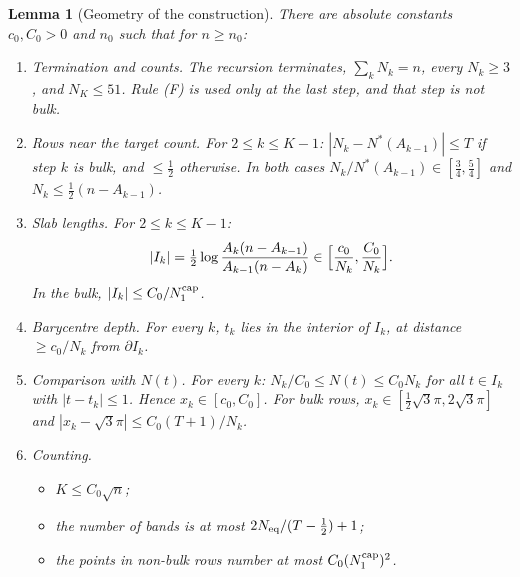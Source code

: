 \documentclass[11pt]{article}
\newtheorem{lemma}[theorem]{Lemma}
\theoremstyle{definition}
\theoremstyle{remark}
\begin{document}
\begin{lemma}[Geometry of the construction]\label{lem:geometry}
There are absolute constants $c_0,C_0>0$ and $n_0$ such that for $n\ge n_0$:
\begin{enumerate}[label=(G\arabic*)]
\item \emph{Termination and counts.} The recursion terminates, $\sum_kN_k=n$, every $N_k\ge3$,
  and $N_K\le51$. Rule (F) is used only at the last step, and that step is not bulk.
\item \emph{Rows near the target count.} For $2\le k\le K-1$: $|N_k-N^*(A_{k-1})|\le T$ if
  step $k$ is bulk, and $\le\tfrac12$ otherwise. In both cases
  $N_k/N^*(A_{k-1})\in[\tfrac34,\tfrac54]$ and $N_k\le\tfrac12(n-A_{k-1})$.
\item \emph{Slab lengths.} For $2\le k\le K-1$:
  \[
  |I_k|=\tfrac12\log\frac{A_k(n-A_{k-1})}{A_{k-1}(n-A_k)}\in\Bigl[\frac{c_0}{N_k},\frac{C_0}{N_k}\Bigr].
  \]
  In the bulk, $|I_k|\le C_0/N_1^{\rm cap}$.
\item \emph{Barycentre depth.} For every $k$, $t_k$ lies in the interior of $I_k$, at distance
  $\ge c_0/N_k$ from $\partial I_k$.
\item \emph{Comparison with $N(t)$.} For every $k$: $N_k/C_0\le N(t)\le C_0N_k$ for all
  $t\in I_k$ with $|t-t_k|\le1$. Hence $x_k\in[c_0,C_0]$. For bulk rows,
  $x_k\in[\tfrac12\sqrt3\pi,2\sqrt3\pi]$ and $|x_k-\sqrt3\pi|\le C_0(T+1)/N_k$.
\item \emph{Counting.}
  \begin{itemize}[leftmargin=*]
  \item $K\le C_0\sqrt n$;
  \item the number of bands is at most $2N_{\rm eq}/(T-\tfrac12)+1$;
  \item the points in non-bulk rows number at most $C_0(N_1^{\rm cap})^2$.
  \end{itemize}
\end{enumerate}
\end{lemma}
\end{document}
